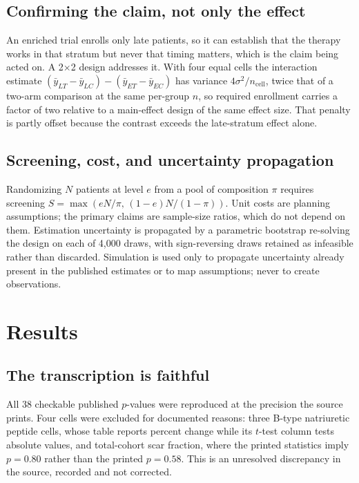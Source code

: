 \documentclass[10pt,twocolumn,letterpaper]{article}
\begin{document}
\subsection{Confirming the claim, not only the effect}

An enriched trial enrolls only late patients, so it can establish that the therapy works in that
stratum but never that timing matters, which is the claim being acted on. A 2$\times$2 design
addresses it. With four equal cells the interaction estimate
$(\bar y_{LT}-\bar y_{LC})-(\bar y_{ET}-\bar y_{EC})$ has variance $4\sigma^2/n_{\text{cell}}$,
twice that of a two-arm comparison at the same per-group $n$, so required enrollment carries a factor
of two relative to a main-effect design of the same effect size. That penalty is partly offset
because the contrast exceeds the late-stratum effect alone.

\subsection{Screening, cost, and uncertainty propagation}

Randomizing $N$ patients at level $e$ from a pool of composition $\pi$ requires screening
$S=\max(eN/\pi,\,(1-e)N/(1-\pi))$. Unit costs are planning assumptions; the primary claims are
sample-size ratios, which do not depend on them. Estimation uncertainty is propagated by a
parametric bootstrap re-solving the design on each of 4{,}000 draws, with sign-reversing draws
retained as infeasible rather than discarded. Simulation is used only to propagate uncertainty
already present in the published estimates or to map assumptions; never to create observations.

\section{Results}

\subsection{The transcription is faithful}

All 38 checkable published $p$-values were reproduced at the precision the source prints. Four cells
were excluded for documented reasons: three B-type natriuretic peptide cells, whose table reports
percent change while its $t$-test column tests absolute values, and total-cohort scar fraction, where
the printed statistics imply $p=0.80$ rather than the printed $p=0.58$. This is an unresolved
discrepancy in the source, recorded and not corrected.
\end{document}
